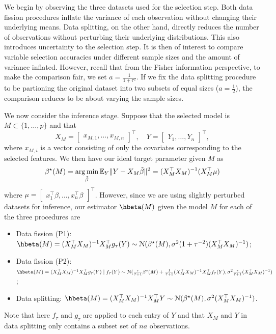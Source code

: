 We begin by observing the three datasets used for the selection step. Both data fission procedures inflate the variance of each observation without changing their underlying means. Data splitting, on the other hand, directly reduces the number of observations without perturbing their underlying distributions. This also introduces uncertainty to the selection step. It is then of interest to compare variable selection accuracies under different sample sizes and the amount of variance inflated. However, recall that from the Fisher information perspective, to make the comparison fair, we set $a = \frac{1}{1+\tau^2}$. If we fix the data splitting procedure to be partioning the original dataset into two subsets of equal sizes ($a=\frac{1}{2}$), the comparison reduces to be about varying the sample sizes.

We now consider the inference stage. Suppose that the selected model is $M\subset\{1,\dots,p\}$ and that
\[
X_M = \begin{bmatrix} x_{M,1}, \dots, x_{M,n} \end{bmatrix}^\top, \quad Y = \begin{bmatrix} Y_1, \dots, Y_n \end{bmatrix}^\top,
\]
where $x_{M,i}$ is a vector consisting of only the covariates corresponding to the selected features. We then have our ideal target parameter given $M$ as
\[
\beta^\star(M) = \argmin_{\tilde{\beta}} \EE_Y \|Y - X_M\tilde{\beta}\|^2 = (X_M^\top X_M)^{-1}(X_M^\top\mu)
\]
where $\mu = \begin{bmatrix} x_1^\top\beta, \dots, x_n^\top\beta \end{bmatrix}^\top$. However, since we are using slightly perturbed datasets for inference, our estimator $\hbeta(M)$ given the model $M$ for each of the three procedures are
\begin{itemize}
\item Data fission (P1): $\hbeta(M) = (X_M^\top X_M)^{-1}X_M^\top g_\tau(Y) \distas \distNorm(\beta^\star(M), \sigma^2(1+\tau^{-2})(X_M^\top X_M)^{-1})$;
\item Data fission (P2):\\ $\hbeta(M) = (X_M^\top X_M)^{-1}X_M^\top g_\tau(Y) \given f_\tau(Y) \distas \distNorm(\frac{\tau}{\tau+1}\beta^\star(M) + \frac{1}{\tau+1}(X_M^\top X_M)^{-1}X_M^\top f_\tau(Y), \sigma^2\frac{\tau}{\tau+1}(X_M^\top X_M)^{-1})$;
\item Data splitting: $\hbeta(M) = (X_M^\top X_M)^{-1}X_M^\top Y \distas \distNorm(\beta^\star(M), \sigma^2(X_M^\top X_M)^{-1})$.
\end{itemize}
Note that here $f_\tau$ and $g_\tau$ are applied to each entry of $Y$ and that $X_M$ and $Y$ in data splitting only contains a subset set of $na$ observations.

